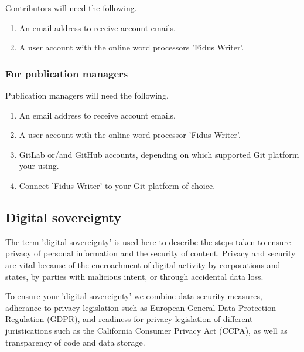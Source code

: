 \documentclass{article}
\begin{document}
Contributors will need the following.

\begin{enumerate}
\item An email address to receive account emails.


\item A user account with the online word processors 'Fidus Writer'.


\end{enumerate}

\subsubsection{For publication managers}\label{H9374516}



Publication managers will need the following.

\begin{enumerate}
\item An email address to receive account emails.


\item A user account with the online word processor 'Fidus Writer'.


\item GitLab or/and GitHub accounts, depending on which supported Git platform your using.


\item Connect 'Fidus Writer' to your Git platform of choice.


\end{enumerate}

\subsection{Digital sovereignty}\label{H584803}



The term 'digital sovereignty' is used here to describe the steps taken to ensure privacy of personal information and the security of content. Privacy and security are vital because of the encroachment of digital activity by corporations and states, by parties with malicious intent, or through accidental data loss.


To ensure your 'digital sovereignty' we combine data security measures, adherance to privacy legislation such as European General Data Protection Regulation (GDPR), and readiness for privacy legislation of different juristications such as the California Consumer Privacy Act (CCPA), as well as transparency of code and data storage.
\end{document}
